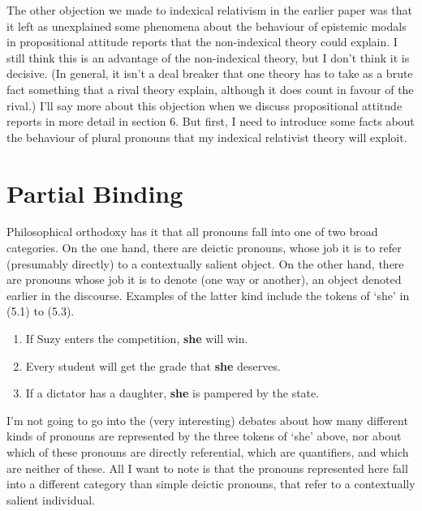 The other objection we made to indexical relativism in the earlier paper was that it left as unexplained some phenomena about the behaviour of epistemic modals in propositional attitude reports that the non-indexical theory could explain. I still think this is an advantage of the non\nobreakdash-indexical theory, but I don't think it is decisive. (In general, it isn't a deal breaker that one theory has to take as a brute fact something that a rival theory explain, although it does count in favour of the rival.) I'll say more about this objection when we discuss propositional attitude reports in more detail in section 6. But first, I need to introduce some facts about the behaviour of plural pronouns that my indexical relativist theory will exploit.


\section{Partial Binding}

Philosophical orthodoxy has it that all pronouns fall into one of two broad categories. On the one hand, there are deictic pronouns, whose job it is to refer (presumably directly) to a contextually salient object. On the other hand, there are pronouns whose job it is to denote (one way or another), an object denoted earlier in the discourse. Examples of the latter kind include the tokens of `she' in (5.1) to (5.3).

\renewcommand{\labelenumi}{(5.\arabic{enumi})}
\begin{enumerate}
\setcounter{enumi}{0}
\item If Suzy enters the competition, \textbf{she} will win.

\item Every student will get the grade that \textbf{she} deserves.

\item If a dictator has a daughter, \textbf{she} is pampered by the state.
\end{enumerate}

\noindent I'm not going to go into the (very interesting) debates about how many different kinds of pronouns are represented by the three tokens of `she' above, nor about which of these pronouns are directly referential, which are quantifiers, and which are neither of these. All I want to note is that the pronouns represented here fall into a different category than simple deictic pronouns, that refer to a contextually salient individual.


